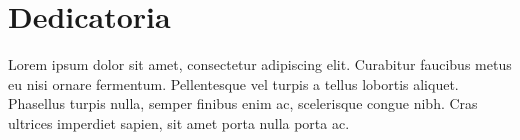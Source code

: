 \chapter*{Dedicatoria}

Lorem ipsum dolor sit amet, consectetur adipiscing elit. Curabitur faucibus metus eu nisi ornare fermentum. Pellentesque vel turpis a tellus lobortis aliquet. Phasellus turpis nulla, semper finibus enim ac, scelerisque congue nibh. Cras ultrices imperdiet sapien, sit amet porta nulla porta ac.